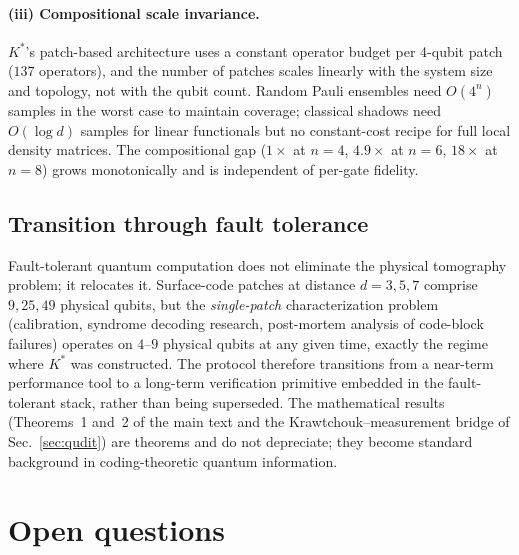 \documentclass[twocolumn,prx,aps,superscriptaddress,longbibliography]{revtex4-2}
\begin{document}
\paragraph*{(iii) Compositional scale invariance.}
$K^*$'s patch-based architecture uses a constant operator budget
per 4-qubit patch ($137$ operators), and the number of patches
scales linearly with the system size and topology, not with the
qubit count.  Random Pauli ensembles need $O(4^n)$ samples in the
worst case to maintain coverage; classical shadows need
$O(\log d)$ samples for linear functionals but no constant-cost
recipe for full local density matrices.  The compositional gap
($1\times$ at $n = 4$, $4.9\times$ at $n = 6$, $18\times$ at
$n = 8$) grows monotonically and is independent of per-gate
fidelity.

\subsection{Transition through fault tolerance}
\label{sm:longevity-ft}

Fault-tolerant quantum computation does not eliminate the physical
tomography problem; it relocates it.
Surface-code patches at distance $d = 3, 5, 7$ comprise
$9, 25, 49$ physical qubits, but the \emph{single-patch}
characterization problem (calibration, syndrome decoding research,
post-mortem analysis of code-block failures) operates on $4$--$9$
physical qubits at any given time, exactly the regime where
$K^*$ was constructed.
The protocol therefore transitions from a near-term performance
tool to a long-term verification primitive embedded in the
fault-tolerant stack, rather than being superseded.
The mathematical results (Theorems~1 and~2 of the main text and
the Krawtchouk--measurement bridge of
Sec.~\ref{sec:qudit}) are theorems and do not depreciate; they
become standard background in coding-theoretic quantum information.

\section{Open questions}
\label{sm:open}
\end{document}
